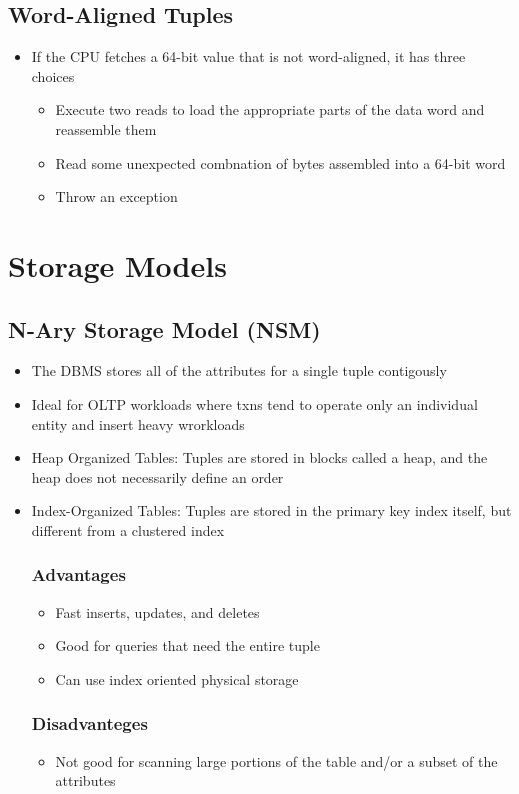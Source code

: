 \documentclass[11pt]{article}
\begin{document}
    \subsection*{Word-Aligned Tuples}
    \begin{itemize}
        \item If the CPU fetches a 64-bit value that is not word-aligned, it has three choices
        \begin{itemize}
            \item Execute two reads to load the appropriate parts of the data word and reassemble them
            \item Read some unexpected combnation of bytes assembled into a 64-bit word
            \item Throw an exception
        \end{itemize}
    \end{itemize}


\section{Storage Models}

    \subsection*{N-Ary Storage Model (NSM)}
    \begin{itemize}
        \item The DBMS stores all of the attributes for a single tuple contigously
        \item Ideal for OLTP workloads where txns tend to operate only an individual entity and insert heavy wrorkloads
        \item Heap Organized Tables: Tuples are stored in blocks called a heap, and the heap does not necessarily define an order
        \item Index-Organized Tables: Tuples are stored in the primary key index itself, but different from a clustered index
        \subsubsection*{\textbf{Advantages}}
        \begin{itemize}
            \item Fast inserts, updates, and deletes
            \item Good for queries that need the entire tuple
            \item Can use index oriented physical storage
        \end{itemize}
        \subsubsection*{\textbf{Disadvanteges}}
        \begin{itemize}
            \item Not good for scanning large portions of the table and/or a subset of the attributes
        \end{itemize}
    \end{itemize}
\end{document}
